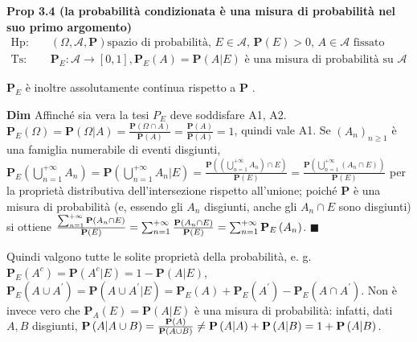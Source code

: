 \documentclass{article}
\begin{document}
\textbf{Prop 3.4 (la probabilit\`{a} condizionata \`{e} una misura di
probabilit\`{a} nel suo primo argomento)}%
\begin{eqnarray*}
\text{Hp}\text{: } &&\left( \Omega ,\mathcal{A},\mathbf{P}\right) \text{
spazio di probabilit\`{a}, }E\in \mathcal{A}\text{, }\mathbf{P}\left(
E\right) >0\text{, }A\in \mathcal{A}\text{ fissato} \\
\text{Ts}\text{: } &&\mathbf{P}_{E}:\mathcal{A}\rightarrow \left[ 0,1\right]
,\mathbf{P}_{E}\left( A\right) =\mathbf{P}\left( A|E\right) \text{ \`{e} una
misura di probabilit\`{a} su }\mathcal{A}
\end{eqnarray*}

$\mathbf{P}_{E}$ \`{e} inoltre assolutamente continua rispetto a $\mathbf{P}$%
.

\textbf{Dim} Affinch\'{e} sia vera la tesi $P_{E}$ deve soddisfare A1, A2. $%
\mathbf{P}_{E}\left( \Omega \right) =\mathbf{P}\left( \Omega |A\right) =%
\frac{\mathbf{P}\left( \Omega \cap A\right) }{\mathbf{P}\left( A\right) }=%
\frac{\mathbf{P}\left( A\right) }{\mathbf{P}\left( A\right) }=1$, quindi
vale A1. Se $\left( A_{n}\right) _{n\geq 1}$ \`{e} una famiglia numerabile
di eventi disgiunti, $\mathbf{P}_{E}\left( \bigcup_{n=1}^{+\infty
}A_{n}\right) =\mathbf{P}\left( \bigcup_{n=1}^{+\infty }A_{n}|E\right) =%
\frac{\mathbf{P}\left( \left( \bigcup_{n=1}^{+\infty }A_{n}\right) \cap
E\right) }{\mathbf{P}\left( E\right) }=\frac{\mathbf{P}\left(
\bigcup_{n=1}^{+\infty }\left( A_{n}\cap E\right) \right) }{\mathbf{P}\left(
E\right) }$ per la propriet\`{a} distributiva dell'intersezione rispetto
all'unione; poich\'{e} $\mathbf{P}$ \`{e} una misura di probabilit\`{a} (e,
essendo gli $A_{n}$ disgiunti, anche gli $A_{n}\cap E$ sono disgiunti) si
ottiene $\frac{\sum_{n=1}^{+\infty }\mathbf{P}\left( A_{n}\cap E\right) }{%
\mathbf{P}\left( E\right) }=\sum_{n=1}^{+\infty }\frac{\mathbf{P}\left(
A_{n}\cap E\right) }{\mathbf{P}\left( E\right) }=\sum_{n=1}^{+\infty }%
\mathbf{P}_{E}\left( A_{n}\right) $. $\blacksquare $

Quindi valgono tutte le solite propriet\`{a} della probabilit\`{a}, e. g. $%
\mathbf{P}_{E}\left( A^{c}\right) =\mathbf{P}\left( A^{c}|E\right) =1-%
\mathbf{P}\left( A|E\right) $, $\mathbf{P}_{E}\left( A\cup A^{\prime
}\right) =\mathbf{P}\left( A\cup A^{\prime }|E\right) =\mathbf{P}_{E}\left(
A\right) +\mathbf{P}_{E}\left( A^{\prime }\right) -\mathbf{P}_{E}\left(
A\cap A^{\prime }\right) $. Non \`{e} invece vero che $\mathbf{P}_{A}\left(
E\right) =\mathbf{P}\left( A|E\right) $ \`{e} una misura di probabilit\`{a}:
infatti, dati $A,B$ disgiunti, $\mathbf{P}\left( A|A\cup B\right) =\frac{%
\mathbf{P}\left( A\right) }{\mathbf{P}\left( A\cup B\right) }\neq \mathbf{P}%
\left( A|A\right) +\mathbf{P}\left( A|B\right) =1+\mathbf{P}\left(
A|B\right) $.
\end{document}
